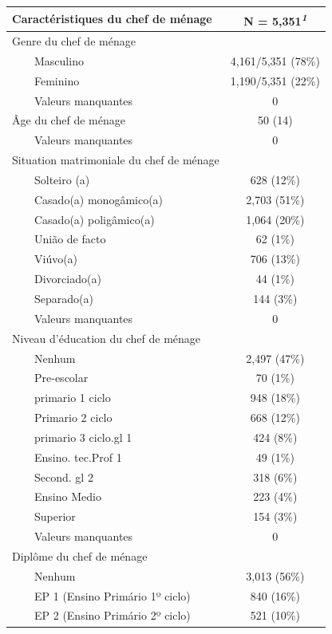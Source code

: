 \documentclass[
]{article}
\begin{document}
\begin{table}[!t]
\fontsize{12.0pt}{14.4pt}\selectfont
\begin{tabular*}{\linewidth}{@{\extracolsep{\fill}}lc}
\toprule
Caractéristiques du chef de ménage & \textbf{N = 5,351}\textsuperscript{\textit{1}} \\ 
\midrule\addlinespace[2.5pt]
Genre du chef de ménage &  \\ 
    Masculino & 4,161/5,351 (78\%) \\ 
    Feminino & 1,190/5,351 (22\%) \\ 
    Valeurs manquantes & 0 \\ 
Âge du chef de ménage & 50 (14) \\ 
    Valeurs manquantes & 0 \\ 
Situation matrimoniale du chef de ménage &  \\ 
    Solteiro (a) & 628 (12\%) \\ 
    Casado(a) monogâmico(a) & 2,703 (51\%) \\ 
    Casado(a) poligâmico(a) & 1,064 (20\%) \\ 
    União de facto & 62 (1\%) \\ 
    Viúvo(a) & 706 (13\%) \\ 
    Divorciado(a) & 44 (1\%) \\ 
    Separado(a) & 144 (3\%) \\ 
    Valeurs manquantes & 0 \\ 
Niveau d'éducation du chef de ménage &  \\ 
    Nenhum & 2,497 (47\%) \\ 
    Pre-escolar & 70 (1\%) \\ 
    primario 1 ciclo & 948 (18\%) \\ 
    Primario 2 ciclo & 668 (12\%) \\ 
    primario 3 ciclo.gl 1 & 424 (8\%) \\ 
    Ensino. tec.Prof 1 & 49 (1\%) \\ 
    Second. gl 2 & 318 (6\%) \\ 
    Ensino Medio & 223 (4\%) \\ 
    Superior & 154 (3\%) \\ 
    Valeurs manquantes & 0 \\ 
Diplôme du chef de ménage &  \\ 
    Nenhum & 3,013 (56\%) \\ 
    EP 1 (Ensino Primário 1º ciclo) & 840 (16\%) \\ 
    EP 2 (Ensino Primário 2º ciclo) & 521 (10\%) \\ 

\end{tabular*}
\end{table}
\end{document}
